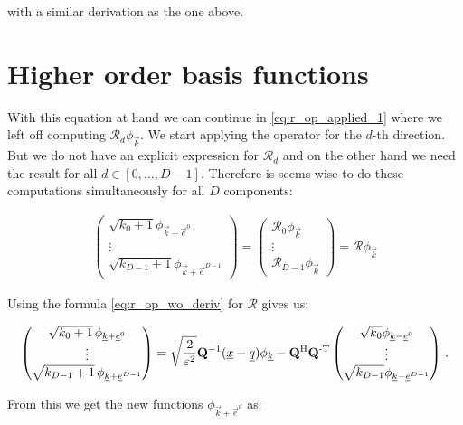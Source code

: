 with a similar derivation as the one above.


\section{Higher order basis functions}


With this equation at hand we can continue in \eqref{eq:r_op_applied_1} where we
left off computing $\mathcal{R}_d \phi_{\vec{k}}$. We start applying the operator
for the $d$-th direction. But we do not have an explicit expression for
$\mathcal{R}_d$ and on the other hand we need the result for all $d \in [0, \ldots, D-1]$.
Therefore is seems wise to do these computations simultaneously for all $D$ components:

\begin{align}
  \begin{pmatrix}
    \sqrt{k_0 + 1} \phi_{\vec{k}+\vec{e}^0} \\
    \vdots \\
    \sqrt{k_{D-1} + 1} \phi_{\vec{k}+\vec{e}^{D-1}}
  \end{pmatrix}
  =
  \begin{pmatrix}
    \mathcal{R}_0 \phi_{\vec{k}} \\
    \vdots \\
    \mathcal{R}_{D-1} \phi_{\vec{k}}
  \end{pmatrix}
  =
  \mathcal{R} \phi_{\vec{k}}
\end{align}

Using the formula \eqref{eq:r_op_wo_deriv} for $\mathcal{R}$ gives us:

\begin{equation} \label{eq:basis_recursion_DD}
  \begin{pmatrix}
    \sqrt{k_0+1} \, \phi_{\underline{k}+\underline{e}^0} \\
    \vdots \\
    \sqrt{k_{D-1}+1} \, \phi_{\underline{k}+\underline{e}^{D-1}}
  \end{pmatrix}
  =
  \sqrt{\frac{2}{\varepsilon^2}} \mathbf{Q}{}^{-1} (\underline{x}-\underline{q}) \phi_{\underline{k}}
  - \mathbf{Q}{}^{\textnormal{H}}\mathbf{Q}{}^{\textnormal{-T}}
  \begin{pmatrix}
    \sqrt{k_0} \phi_{\underline{k}-\underline{e}^0} \\
    \vdots \\
    \sqrt{k_{D-1}} \phi_{\underline{k}-\underline{e}^{D-1}}
  \end{pmatrix} \,.
\end{equation}

From this we get the new functions $\phi_{\vec{k}+\vec{e}^d}$ as:

